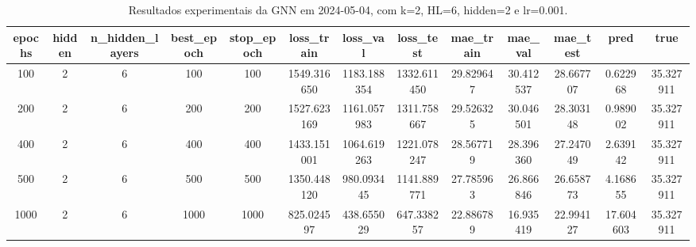 \begin{table}[h]
\centering
\caption{Resultados experimentais da GNN em 2024-05-04, com k=2, HL=6, hidden=2 e lr=0.001.}
\label{tab:gnn_results_k2_hl6_h2_d20240504}
\begin{tabular}{ccccccccccccc}
\toprule
epochs & hidden & n\_hidden\_layers & best\_epoch & stop\_epoch & loss\_train & loss\_val & loss\_test & mae\_train & mae\_val & mae\_test & pred & true \\
\midrule
100 & 2 & 6 & 100 & 100 & 1549.316650 & 1183.188354 & 1332.611450 & 29.829647 & 30.412537 & 28.667707 & 0.622968 & 35.327911 \\
200 & 2 & 6 & 200 & 200 & 1527.623169 & 1161.057983 & 1311.758667 & 29.526325 & 30.046501 & 28.303148 & 0.989002 & 35.327911 \\
400 & 2 & 6 & 400 & 400 & 1433.151001 & 1064.619263 & 1221.078247 & 28.567719 & 28.396360 & 27.247049 & 2.639142 & 35.327911 \\
500 & 2 & 6 & 500 & 500 & 1350.448120 & 980.093445 & 1141.889771 & 27.785963 & 26.866846 & 26.658773 & 4.168655 & 35.327911 \\
1000 & 2 & 6 & 1000 & 1000 & 825.024597 & 438.655029 & 647.338257 & 22.886789 & 16.935419 & 22.994127 & 17.604603 & 35.327911 \\
\bottomrule
\end{tabular}
\end{table}
